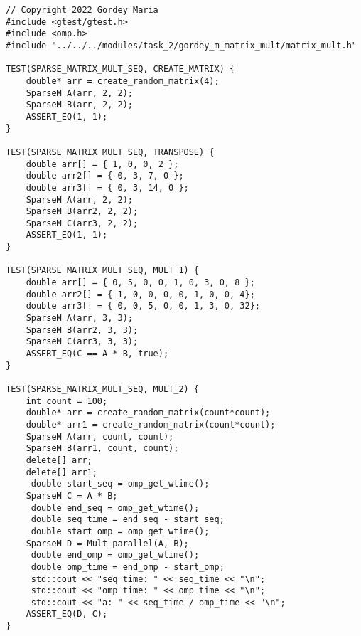 \documentclass{report}
\begin{document}
\begin{lstlisting}
// Copyright 2022 Gordey Maria
#include <gtest/gtest.h>
#include <omp.h>
#include "../../../modules/task_2/gordey_m_matrix_mult/matrix_mult.h"

TEST(SPARSE_MATRIX_MULT_SEQ, CREATE_MATRIX) {
    double* arr = create_random_matrix(4);
    SparseM A(arr, 2, 2);
    SparseM B(arr, 2, 2);
    ASSERT_EQ(1, 1);
}

TEST(SPARSE_MATRIX_MULT_SEQ, TRANSPOSE) {
    double arr[] = { 1, 0, 0, 2 };
    double arr2[] = { 0, 3, 7, 0 };
    double arr3[] = { 0, 3, 14, 0 };
    SparseM A(arr, 2, 2);
    SparseM B(arr2, 2, 2);
    SparseM C(arr3, 2, 2);
    ASSERT_EQ(1, 1);
}

TEST(SPARSE_MATRIX_MULT_SEQ, MULT_1) {
    double arr[] = { 0, 5, 0, 0, 1, 0, 3, 0, 8 };
    double arr2[] = { 1, 0, 0, 0, 0, 1, 0, 0, 4};
    double arr3[] = { 0, 0, 5, 0, 0, 1, 3, 0, 32};
    SparseM A(arr, 3, 3);
    SparseM B(arr2, 3, 3);
    SparseM C(arr3, 3, 3);
    ASSERT_EQ(C == A * B, true);
}

TEST(SPARSE_MATRIX_MULT_SEQ, MULT_2) {
    int count = 100;
    double* arr = create_random_matrix(count*count);
    double* arr1 = create_random_matrix(count*count);
    SparseM A(arr, count, count);
    SparseM B(arr1, count, count);
    delete[] arr;
    delete[] arr1;
     double start_seq = omp_get_wtime();
    SparseM C = A * B;
     double end_seq = omp_get_wtime();
     double seq_time = end_seq - start_seq;
     double start_omp = omp_get_wtime();
    SparseM D = Mult_parallel(A, B);
     double end_omp = omp_get_wtime();
     double omp_time = end_omp - start_omp;
     std::cout << "seq time: " << seq_time << "\n";
     std::cout << "omp time: " << omp_time << "\n";
     std::cout << "a: " << seq_time / omp_time << "\n";
    ASSERT_EQ(D, C);
}


\end{lstlisting}
\end{document}
